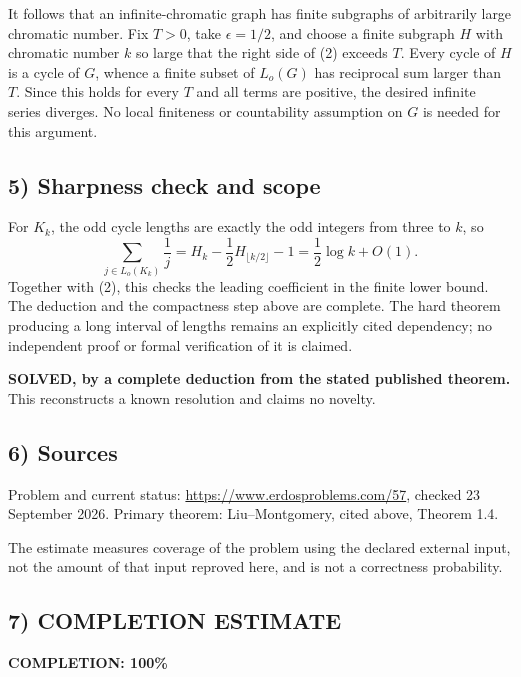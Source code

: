 It follows that an infinite-chromatic graph has finite subgraphs of arbitrarily large chromatic number. Fix $T>0$, take $\epsilon=1/2$, and choose a finite subgraph $H$ with chromatic number $k$ so large that the right side of (2) exceeds $T$. Every cycle of $H$ is a cycle of $G$, whence a finite subset of $L_o(G)$ has reciprocal sum larger than $T$. Since this holds for every $T$ and all terms are positive, the desired infinite series diverges. No local finiteness or countability assumption on $G$ is needed for this argument.

\subsection*{5) Sharpness check and scope}
For $K_k$, the odd cycle lengths are exactly the odd integers from three to $k$, so
\[
 \sum_{j\in L_o(K_k)}\frac1j
 =H_k-\frac12H_{\lfloor k/2\rfloor}-1
 =\frac12\log k+O(1).
\]
Together with (2), this checks the leading coefficient in the finite lower bound. The deduction and the compactness step above are complete. The hard theorem producing a long interval of lengths remains an explicitly cited dependency; no independent proof or formal verification of it is claimed.

\textbf{SOLVED, by a complete deduction from the stated published theorem.} This reconstructs a known resolution and claims no novelty.

\subsection*{6) Sources}
Problem and current status: \url{https://www.erdosproblems.com/57}, checked 23 September 2026. Primary theorem: Liu--Montgomery, cited above, Theorem 1.4.

The estimate measures coverage of the problem using the declared external input, not the amount of that input reproved here, and is not a correctness probability.
\subsection*{7) COMPLETION ESTIMATE}
\textbf{COMPLETION: 100\%}
